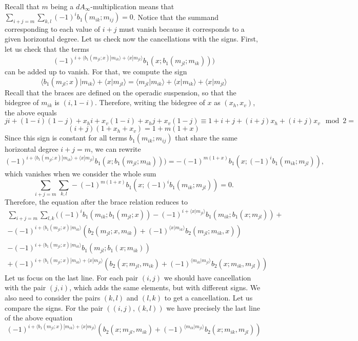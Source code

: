 \documentclass[twoside]{article}
\begin{document}
Recall that $m$ being a $dA_\infty$-multiplication means that $\sum_{i+j=m}\sum_{k,l}(-1)^ib_1(m_{ik};m_{ij})=0$. Notice that the summand corresponding to each value of $i+j$ must vanish because it corresponds to a given horizontal degree. Let us check now the cancellations with the signs. First, let us check that the terms 
\[(-1)^{i+\langle b_1(m_{jl};x)|m_{ik}\rangle+\langle x|m_{jl}\rangle}b_1(x;b_1(m_{jl};m_{ik})))\]
can be added up to vanish. For that, we compute the sign \[\langle b_1(m_{jl};x)|m_{ik}\rangle+\langle x|m_{jl}\rangle=\langle m_{jl}|m_{ik}\rangle+\langle x|m_{ik}\rangle+\langle x|m_{jl}\rangle\]
Recall that the braces are defined on the operadic suspension, so that the bidegree of $m_{ik}$ is $(i,1-i)$. Therefore, writing the bidegree of $x$ as $(x_h,x_v)$, the above equals 
\[ji+(1-i)(1-j)+x_hi+x_v(1-i)+x_hj+x_v(1-j)\equiv 1+i+j + (i+j)x_h+(i+j)x_v\mod 2=\]
\[(i+j)(1+x_h+x_v)=1+m(1+x)\]
Since this sign is constant for all terms $b_1(m_{ik};m_{ij})$ that share the same horizontal degree $i+j=m$, we can rewrite
\[(-1)^{i+\langle b_1(m_{jl};x)|m_{ik}\rangle+\langle x|m_{jl}\rangle}b_1(x;b_1(m_{jl};m_{ik})))=-(-1)^{m(1+x)}b_1(x;(-1)^ib_1(m_{ik};m_{jl})),\]
which vanishes when we consider the whole sum
\[\sum_{i+j=m}\sum_{k,l}-(-1)^{m(1+x)}b_1(x;(-1)^ib_1(m_{ik};m_{jl}))=0.\]
Therefore, the equation after the brace relation reduces to
\begin{align*}
\sum_{i+j=m}\sum_{l,k}((-1)^ib_1(m_{ik}; b_1(m_{jl};x))-(-1)^{i+\langle x|m_{jl}\rangle}b_1(m_{ik};b_1(x;m_{jl}))+\\
 -(-1)^{i+\langle b_1(m_{jl};x)|m_{ik}\rangle}(b_2(m_{jl};x,m_{ik})+(-1)^{\langle x|m_{ik}\rangle}b_2(m_{jl};m_{ik},x))\\
 -(-1)^{i+\langle b_1(m_{jl};x)|m_{ik}\rangle}b_1(m_{jl};b_1(x;m_{ik}))\\
+(-1)^{i+\langle b_1(m_{jl};x)|m_{ik}\rangle+\langle x|m_{jl}\rangle}(b_2(x;m_{jl},m_{ik})+(-1)^{\langle m_{ik}|m_{jl}\rangle}b_2(x;m_{ik},m_{jl}))
\end{align*}
Let us focus on the last line. For each pair $(i,j)$ we should have cancellation with the pair $(j,i)$, which adds the same elements, but with different signs. We also need to consider the pairs $(k,l)$ and $(l,k)$ to get a cancellation. Let us compare the signs. For the pair $((i,j),(k,l))$ we have precisely the last line of the above equation
\[(-1)^{i+\langle b_1(m_{jl};x)|m_{ik}\rangle+\langle x|m_{jl}\rangle}(b_2(x;m_{jl},m_{ik})+(-1)^{\langle m_{ik}|m_{jl}\rangle}b_2(x;m_{ik},m_{jl}))\]
\end{document}
